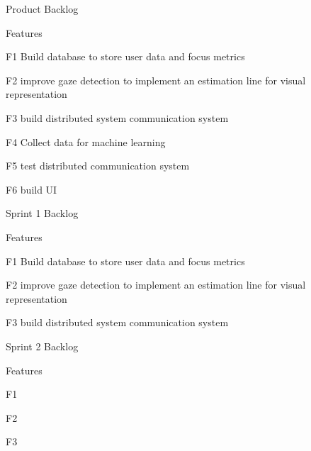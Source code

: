 \documentclass[12pt]{article}
\begin{document}
\begin{sectionbox}[colback=white]{Product Backlog}
\begin{subsectionbox}[colback=white]{Features}
\begin{featurebox}[colback=white]{F1}
Build database to store user data and focus metrics
\end{featurebox}
\begin{featurebox}[colback=white]{F2}
improve gaze detection to implement an estimation line for visual representation
\end{featurebox}
\begin{featurebox}[colback=white]{F3}
build distributed system communication system
\end{featurebox}
\begin{featurebox}[colback=white]{F4}
Collect data for machine learning
\end{featurebox}
\begin{featurebox}[colback=white]{F5}
test distributed communication system
\end{featurebox}
\begin{featurebox}[colback=white]{F6}
build UI
\end{featurebox}

\end{subsectionbox}
\end{sectionbox}

\begin{sectionbox}[colback=white]{Sprint 1 Backlog}
\begin{subsectionbox}[colback=white]{Features}
\begin{featurebox}[colback=white]{F1}
Build database to store user data and focus metrics
\end{featurebox}
\begin{featurebox}[colback=white]{F2}
improve gaze detection to implement an estimation line for visual representation
\end{featurebox}
\begin{featurebox}[colback=white]{F3}
build distributed system communication system
\end{featurebox}
\end{subsectionbox}
\end{sectionbox}

\begin{sectionbox}[colback=white]{Sprint 2 Backlog}
\begin{subsectionbox}[colback=white]{Features}
\begin{featurebox}[colback=white]{F1}

\end{featurebox}
\begin{featurebox}[colback=white]{F2}

\end{featurebox}
\begin{featurebox}[colback=white]{F3}

\end{featurebox}
\end{subsectionbox}
\end{sectionbox}
\end{document}

